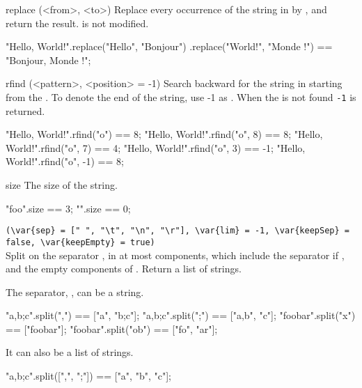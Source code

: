\begin{urbiscriptapi}
\item[replace](<from>, <to>)%
  Replace every occurrence of the string  in \this by ,
  and return the result.  \this is not modified.
\begin{urbiassert}
"Hello, World!".replace("Hello", "Bonjour")
                      .replace("World!", "Monde !") ==
       "Bonjour, Monde !";
\end{urbiassert}


\item[rfind](<pattern>, <position> = -1)%
  Search backward for the  string in \this starting from the
  .  To denote the end of the string, use -1 as
  .  When the  is not found \lstinline|-1| is
  returned.
\begin{urbiassert}
"Hello, World!".rfind("o")     == 8;
"Hello, World!".rfind("o", 8)  == 8;
"Hello, World!".rfind("o", 7)  == 4;
"Hello, World!".rfind("o", 3)  == -1;
"Hello, World!".rfind("o", -1) == 8;
\end{urbiassert}


\item[size]
  The size of the string.
\begin{urbiassert}
"foo".size == 3;
   "".size == 0;
\end{urbiassert}


\item {}%
  \lstinline|(\var{sep} = [" ", "\t", "\n", "\r"], \var{lim} = -1, \var{keepSep} = false, \var{keepEmpty} = true)|\\
  Split \this on the separator , in at most 
  components, which include the separator if , and the
  empty components of .  Return a list of strings.

  The separator, , can be a string.

\begin{urbiassert}
       "a,b;c".split(",") == ["a", "b;c"];
       "a,b;c".split(";") == ["a,b", "c"];
      "foobar".split("x") == ["foobar"];
     "foobar".split("ob") == ["fo", "ar"];
\end{urbiassert}

\noindent
It can also be a list of strings.

\begin{urbiassert}
"a,b;c".split([",", ";"]) == ["a", "b", "c"];
\end{urbiassert}


\end{urbiscriptapi}
